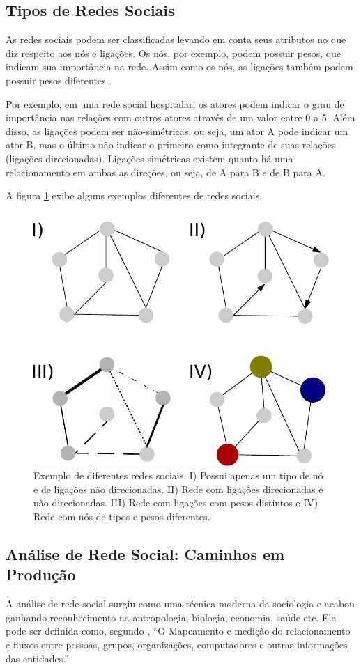 \subsection{Tipos de Redes Sociais}
As redes sociais podem ser classificadas levando em conta seus atributos no que diz respeito aos nós e ligações. Os nós, por exemplo, podem possuir pesos, que indicam sua importância na rede. Assim como os nós, as ligações também podem possuir pesos diferentes \cite{pan2007effective}. 

Por exemplo, em uma rede social hospitalar, os atores podem indicar o grau de importância nas relações com outros atores através de um valor entre 0 a 5. Além disso, as ligações podem ser não-simétricas, ou seja, um ator A pode indicar um ator B, mas o último não indicar o primeiro como integrante de suas relações (ligações direcionadas). Ligações simétricas existem quanto há uma relacionamento em ambas as direções, ou seja, de A para B e de B para A.

A figura \ref{fig:graph-types} exibe alguns exemplos diferentes de redes sociais.

\begin{figure}[htbp]
\centering
 \includegraphics[width=.85\textwidth]{figuras/tipos.pdf}
 \caption{Exemplo de diferentes redes sociais. I) Possui apenas um tipo de nó e de ligações não direcionadas. II) Rede com ligações direcionadas e não direcionadas. III) Rede com ligações com pesos distintos e IV) Rede com nós de tipos e pesos diferentes.}
\label{fig:graph-types}
\end{figure}

\subsection{Análise de Rede Social: Caminhos em Produção}
A análise de rede social surgiu como uma técnica moderna da sociologia e acabou ganhando reconhecimento na antropologia, biologia, economia, saúde etc. Ela pode ser definida como, segundo \cite{krebs2015}, ``O Mapeamento e medição do relacionamento e fluxos entre pessoas, grupos, organizações, computadores e outras informações das entidades.''

